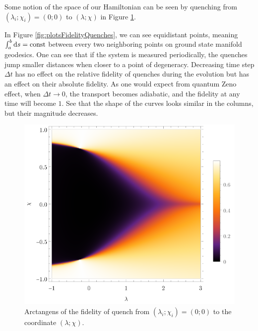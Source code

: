Some notion of the space of our Hamiltonian can be seen by quenching from $(\lambda_i;\chi_i)=(0;0)$ to $(\lambda;\chi)$ in Figure \ref{fig:quenchFidelityFrom00}.


In Figure \ref{fig:plotsFidelityQuenches}, we can see equidistant points, meaning $\int_{a}^{b} \mathrm{d} s=\text{const}$ between every two neighboring points on ground state manifold geodesics. One can see that if the system is measured periodically, the quenches jump smaller distances when closer to a point of degeneracy. Decreasing time step $\Delta t$ has no effect on the relative fidelity of quenches during the evolution but has an effect on their absolute fidelity. As one would expect from quantum Zeno effect, when $\Delta t\rightarrow 0$, the transport becomes adiabatic, and the fidelity at any time will become $1$. See that the shape of the curves looks similar in the columns, but their magnitude decreases.

\begin{figure}[H]
    \centering
    \includegraphics[scale=1.2]{../img/quenchFidelityFrom00.pdf}
    \caption{Arctangens of the fidelity of quench from $(\lambda_i;\chi_i)=(0;0)$ to the coordinate $(\lambda;\chi)$.}
    \label{fig:quenchFidelityFrom00}    
\end{figure}


